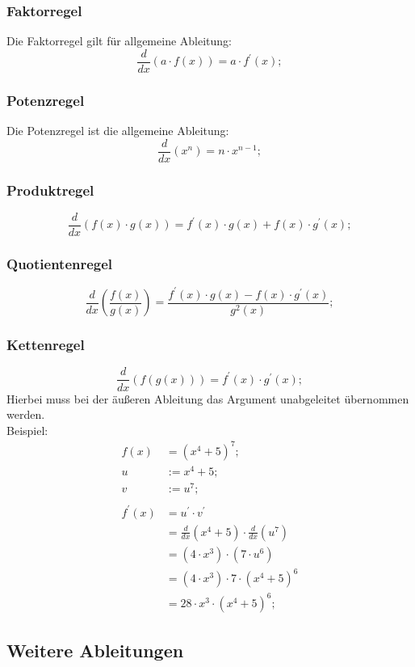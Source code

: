 \documentclass[a4paper]{article}
\begin{document}
\subsubsection{Faktorregel}
Die Faktorregel gilt f\"ur allgemeine Ableitung:
\[
	\frac{d}{dx} \left( a \cdot f(x) \right) = a \cdot f^\prime(x);
\]

\subsubsection{Potenzregel}
Die Potenzregel ist die allgemeine Ableitung:
\[
	\frac{d}{dx} \left( x^n \right) = n \cdot x^{n - 1} ;
\]

\subsubsection{Produktregel}
\[
	\frac{d}{dx} \left( f(x) \cdot g(x) \right) = f^\prime(x) \cdot g(x) + f(x) \cdot g^\prime(x) ;
\]

\subsubsection{Quotientenregel}
\[
	\frac{d}{dx} \left( \frac{f(x)}{g(x)} \right) = \frac{f^\prime(x) \cdot g(x) - f(x) \cdot g^\prime(x)}{ g^2(x) } ;
\]

\subsubsection{Kettenregel}
\[
	\frac{d}{dx} \left( f(g(x))  \right) = f^\prime(x) \cdot g^\prime(x) ;
\]
Hierbei muss bei der \"au{\ss}eren Ableitung das Argument unabgeleitet \"ubernommen werden.
\\ Beispiel:
\begin{align*}
	f(x) &= (x^4 + 5)^7 ;
	\\
	u &:= x^4 + 5 ;
	\\
	v &:= u^7 ;
	\\
	\\
	f^\prime(x) &= u^\prime \cdot v^\prime
	\\
	&= \frac{d}{dx} \left( x^4 + 5 \right) \cdot \frac{d}{dx} \left( u^7 \right)
	\\
	&= (4 \cdot x^3) \cdot (7 \cdot u^6)
	\\
	&= (4 \cdot x^3) \cdot 7 \cdot (x^4 + 5)^6
	\\
	&= 28 \cdot x^3 \cdot (x^4 + 5)^6 ;
\end{align*}

\subsection{Weitere Ableitungen}
\end{document}
